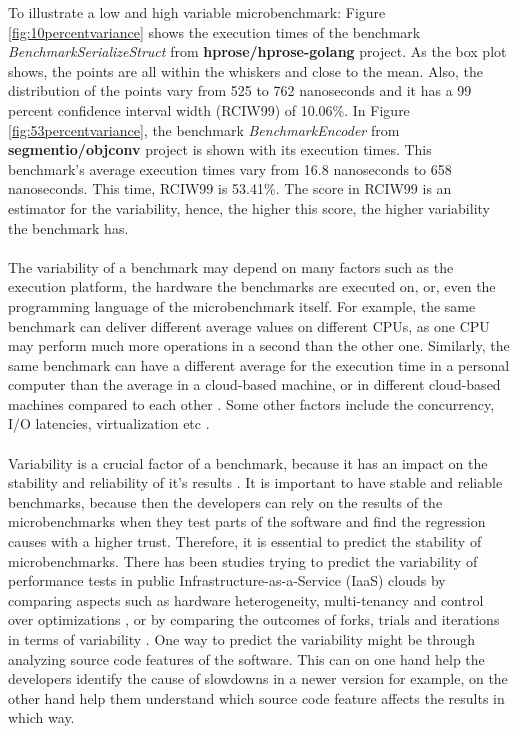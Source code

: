 \documentclass{seal_thesis}
\begin{document}
\noindent To illustrate a low and high variable microbenchmark: Figure \ref{fig:10percentvariance} shows the execution times of the benchmark \textit{BenchmarkSerializeStruct} from \textbf{hprose/hprose-golang} project\cite{hprose/hprose-golang}. As the box plot shows, the points are all within the whiskers and close to the mean. Also, the distribution of the points vary from 525 to 762 nanoseconds and it has a 99 percent confidence interval width (RCIW99) of 10.06\%. In Figure \ref{fig:53percentvariance}, the benchmark \textit{BenchmarkEncoder} from \textbf{segmentio/objconv} project \cite{segmentio/objconv} is shown with its execution times. This benchmark's average execution times vary from 16.8 nanoseconds to 658 nanoseconds. This time, RCIW99 is 53.41\%. The  score in RCIW99 is an estimator for the variability, hence, the higher this score, the higher variability the benchmark has.\\
\\
The variability of a benchmark may depend on many factors such as the execution platform, the hardware the benchmarks are executed on, or, even the programming language of the microbenchmark itself\cite{laaber2018performance}. For example, the same benchmark can deliver different average values on different CPUs, as one CPU may perform much more operations in a second than the other one. Similarly, the same benchmark can have a different average for the execution time in a personal computer than the average in a cloud-based machine, or in different cloud-based machines compared to each other \cite{laaber2019software}. Some other factors include the concurrency, I/O latencies, virtualization etc \cite{laaber2019software}. \\
\\
Variability is a crucial factor of a benchmark, because it has an impact on the stability and reliability of it's results \cite{Laaber:2018:EOS:3196398.3196407}. It is important to have stable and reliable benchmarks, because then the developers can rely on the results of the microbenchmarks when they test parts of the software and find the regression causes with a higher trust. Therefore, it is essential to predict the stability of microbenchmarks. There has been studies trying to predict the variability of performance tests in public Infrastructure-as-a-Service (IaaS) clouds by comparing aspects such as hardware heterogeneity, multi-tenancy and control over optimizations \cite{Leitner:2016:PCS:2926746.2885497}, or by comparing the outcomes of forks, trials and iterations in terms of variability \cite{laaber2019software}. One way to predict the variability might be through analyzing source code features of the software. This can on one hand help the developers identify the cause of slowdowns in a newer version for example, on the other hand help them understand which source code feature affects the results in which way.\\
\end{document}
